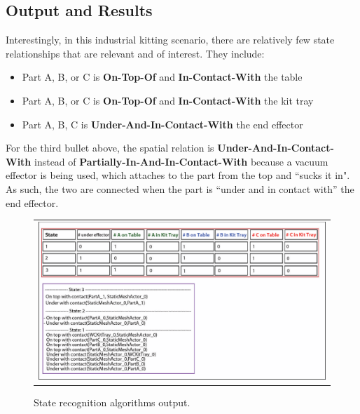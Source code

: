 \documentclass[preprint,12pt]{elsarticle}
\newcommand{\sr}[1] {\textbf{#1}}
\begin{document}
\subsection{Output and Results}
Interestingly, in this industrial kitting scenario, there are relatively few state relationships that are relevant and of interest. They include:
\begin{itemize}
 \item Part A, B, or C is \sr{On-Top-Of} and \sr{In-Contact-With} the table
 \item Part A, B, or C is \sr{On-Top-Of} and \sr{In-Contact-With} the kit tray
 \item Part A, B, C is \sr{Under-And-In-Contact-With} the end effector
\end{itemize}

For the third bullet above, the spatial relation is \sr{Under-And-In-Contact-With} instead of \sr{Partially-In-And-In-Contact-With} because a vacuum effector is being used, which attaches to the part from the top and ``sucks it in". As such, the two are connected when the part is ``under and in contact with'' the end effector.

\begin{figure}[h!t!]
\begin{center}
\begin{tabular}{c}
\includegraphics[width=13cm]{checker.pdf}
\end{tabular}
\end{center}
\caption{State recognition algorithms output.}
\label{fig:staterecognition}
\end{figure}
\end{document}
